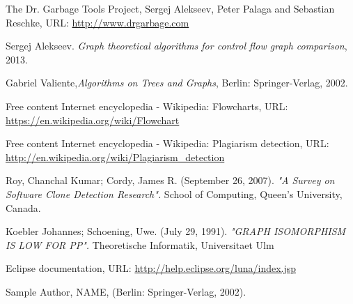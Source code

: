 \documentclass{report}
\begin{document}
\newpage
%
\begin{thebibliography}{100} %

 The Dr. Garbage Tools Project\textregistered {}, Sergej Alekseev, Peter Palaga and Sebastian Reschke, URL:
\url{http://www.drgarbage.com}

  Sergej Alekseev. \emph{ Graph theoretical algorithms for control flow graph comparison}, 2013.
 
 Gabriel Valiente,\emph{Algorithms on Trees and Graphs}, Berlin: Springer-Verlag, 2002.

 Free content Internet encyclopedia - Wikipedia: Flowcharts, URL: \url{https://en.wikipedia.org/wiki/Flowchart}

 Free content Internet encyclopedia - Wikipedia: Plagiarism detection, URL: \url{http://en.wikipedia.org/wiki/Plagiarism_detection}
 
 Roy, Chanchal Kumar; Cordy, James R. (September 26, 2007). \emph{"A Survey on Software Clone Detection Research".} School of Computing, Queen's University, Canada.

 Koebler Johannes; Schoening, Uwe. (July 29, 1991). \emph{"GRAPH ISOMORPHISM IS LOW FOR PP".} Theoretische Informatik, Universitaet Ulm


 Eclipse documentation, URL: \url{http://help.eclipse.org/luna/index.jsp}



 Sample Author, NAME,
(Berlin: Springer-Verlag, 2002).

\end{thebibliography} 
\end{document}
